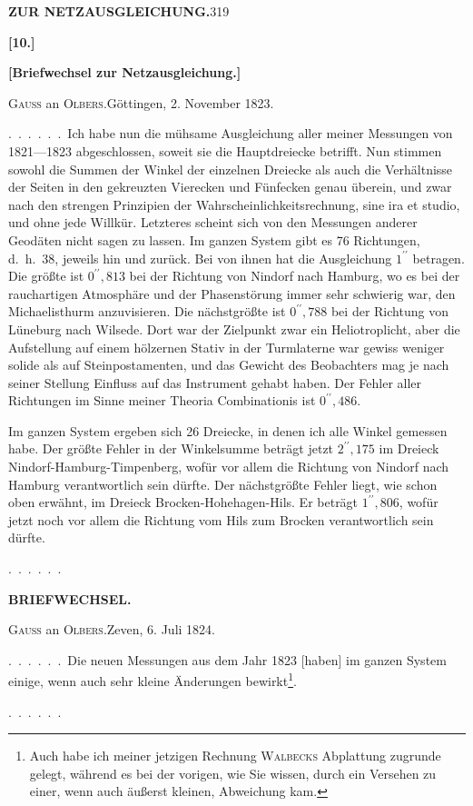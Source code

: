 \noindent\textbf{ZUR NETZAUSGLEICHUNG.}\hfill319
\begin{center}\textbf{[10.]}\par\medskip
\textbf{[Briefwechsel zur Netzausgleichung.]}\end{center}

\begin{center}\textsc{Gauss} an \textsc{Olbers}.\quad Göttingen, 2. November 1823.\end{center}

.\ .\ .\ .\ .\ .\ Ich habe nun die mühsame Ausgleichung aller meiner
Messungen von 1821---1823 abgeschlossen, soweit sie die Hauptdreiecke betrifft.
Nun stimmen sowohl die Summen der Winkel der einzelnen Dreiecke als auch die
Verhältnisse der Seiten in den gekreuzten Vierecken und Fünfecken genau überein,
und zwar nach den strengen Prinzipien der Wahrscheinlichkeitsrechnung, sine
ira et studio, und ohne jede Willkür. Letzteres scheint sich von den Messungen
anderer Geodäten nicht sagen zu lassen. Im ganzen System gibt es 76 Richtungen,
d.\ h.\ 38, jeweils hin und zurück. Bei  von ihnen hat
die Ausgleichung $1^{\prime\prime}$ betragen. Die größte ist $0^{\prime\prime}{,}813$
bei der Richtung von Nindorf nach Hamburg, wo es bei der rauchartigen Atmosphäre
und der Phasenstörung immer sehr schwierig war, den Michaelisthurm anzuvisieren.
Die nächstgrößte ist $0^{\prime\prime}{,}788$ bei der Richtung von Lüneburg nach
Wilsede. Dort war der Zielpunkt zwar ein Heliotroplicht, aber die Aufstellung
auf einem hölzernen Stativ in der Turmlaterne war gewiss weniger solide als
auf Steinpostamenten, und das Gewicht des Beobachters mag je nach seiner Stellung
Einfluss auf das Instrument gehabt haben. Der  Fehler
aller Richtungen im Sinne meiner Theoria Combinationis ist $0^{\prime\prime}{,}486$.

Im ganzen System ergeben sich 26 Dreiecke, in denen ich alle Winkel
gemessen habe. Der größte Fehler in der Winkelsumme beträgt jetzt $2^{\prime\prime}{,}175$
im Dreieck Nindorf-Hamburg-Timpenberg, wofür vor allem die Richtung von
Nindorf nach Hamburg verantwortlich sein dürfte. Der nächstgrößte Fehler
liegt, wie schon oben erwähnt, im Dreieck Brocken-Hohehagen-Hils. Er beträgt
$1^{\prime\prime}{,}806$, wofür jetzt noch vor allem die Richtung vom Hils zum
Brocken verantwortlich sein dürfte.
\par\medskip
.\ .\ .\ .\ .\ .

\clearpage
{}\hfill\textbf{BRIEFWECHSEL.}
\begin{center}\textsc{Gauss} an \textsc{Olbers}.\quad Zeven, 6. Juli 1824.\end{center}

\begingroup
\makeatletter
\renewcommand{\@makefnmark}{\hbox{\normalfont\textsuperscript{*})}}
\makeatother
.\ .\ .\ .\ .\ .\ Die neuen Messungen aus dem Jahr 1823 [haben] im ganzen
System einige, wenn auch sehr kleine Änderungen bewirkt\footnote{Auch habe ich meiner jetzigen Rechnung \textsc{Walbecks} Abplattung  zugrunde gelegt, während es bei der vorigen, wie Sie wissen, durch ein Versehen zu einer, wenn auch äußerst kleinen, Abweichung kam.}.
\par\medskip
.\ .\ .\ .\ .\ .
\endgroup
